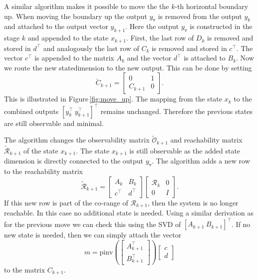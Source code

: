 \documentclass[doctype=mastersthesis,BCOR=15mm,biblatex]{ldvbook}%
\newcommand{\R}{\mathcal{R}} %
\newcommand{\Ob}{\mathcal{O}} %
\newcommand{\eye}{I} %
\newcommand{\m}{\triangledown} %
\begin{document}
A similar algorithm makes it possible to move the the $k$-th horizontal boundary up.
When moving the boundary up the output $y_\m$ is removed from the output $y_k$ and attached to the output vector $y_{k+1}$.
Here the output $y_\m$ is constructed in the stage $k$ and appended to the state $x_{k+1}$.
First, the last row of $D_{k}$ is removed and stored in $d^\top$ and analogously the last row of $C_k$ is removed and stored in $c^\top$.
The vector $c^\top$ is appended to the matrix $A_k$ and the vector $d^\top$ is attached to $B_k$.
Now we route the new statedimension to the new output.
This can be done by setting 
\begin{equation}
	\breve{C}_{k+1} = 
	\begin{bmatrix}
	0 & 1\\ C_{k+1} & 0
	\end{bmatrix}
	.
\end{equation}
This is illustrated in Figure\,\ref{fig:move_up}.
The mapping from the state $x_k$ to the combined outputs $[y_k^\top \: y_{k+1}^\top]^\top$ remains unchanged. Therefore the previous states are still observable and minimal.

The algorithm changes the observability matrix $\tilde{\Ob}_{k+1}$ and reachability matrix $\tilde{\R}_{k+1}$ of the state $x_{k+1}$.
The state $x_{k+1}$ is still observable as the added state dimension is directly connected to the output $y_\m$.
The algorithm adds a new row to the reachability matrix
\begin{equation}
\tilde{\R}_{k+1}
=
\begin{bmatrix}
A_{k} & B_{k}\\
c^\top & d^\top
\end{bmatrix}
\begin{bmatrix}
\R_{k} &0\\
0& \eye
\end{bmatrix}
.
\end{equation}
If this new row is part of the co-range of $\R_{k+1}$, then the system is no longer reachable.
In this case no additional state is needed. 
Using a similar derivation as for the previous move we can check this using the SVD of $[A_{k+1} \: B_{k+1}]^\top$.
If no new state is needed, then we can simply attach the vector
\begin{equation}
	m = \text{pinv}\left(\begin{bmatrix}
	A_{k+1}^\top\\B_{k+1}^\top
	\end{bmatrix}\right) 
	\begin{bmatrix}
	c \\ d
	\end{bmatrix}
\end{equation}
to the matrix $C_{k+1}$.
\end{document}
